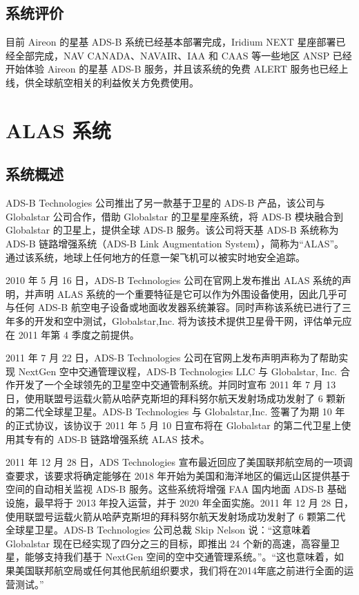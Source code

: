 
\subsection{系统评价}

目前 Aireon 的星基 ADS-B 系统已经基本部署完成，Iridium NEXT 星座部署已经全部完成，NAV CANADA、NAVAIR、IAA 和 CAAS 等一些地区 ANSP 已经开始体验 Aireon 的星基 ADS-B 服务，并且该系统的免费 ALERT 服务也已经上线，供全球航空相关的利益攸关方免费使用。

\section{ALAS 系统}

\subsection{系统概述}

ADS-B Technologies 公司推出了另一款基于卫星的 ADS-B 产品，该公司与 Globalstar 公司合作，借助 Globalstar 的卫星星座系统，将 ADS-B 模块融合到 Globalstar 的卫星上，提供全球 ADS-B 服务。该公司将天基 ADS-B 系统称为 ADS-B 链路增强系统（ADS-B Link Augmentation System），简称为“ALAS”。通过该系统，地球上任何地方的任意一架飞机可以被实时地安全追踪。

2010 年 5 月 16 日，ADS-B Technologies 公司在官网上发布推出 ALAS 系统的声明，并声明 ALAS 系统的一个重要特征是它可以作为外围设备使用，因此几乎可与任何 ADS-B 航空电子设备或地面收发器系统兼容。同时声称该系统已进行了三年多的开发和空中测试，Globalstar,Inc. 将为该技术提供卫星骨干网，评估单元应在 2011 年第 4 季度之前提供。

2011 年 7 月 22 日，ADS-B Technologies 公司在官网上发布声明声称为了帮助实现 NextGen 空中交通管理议程，ADS-B Technologies LLC 与 Globalstar, Inc. 合作开发了一个全球领先的卫星空中交通管制系统。并同时宣布 2011 年 7 月 13 日，使用联盟号运载火箭从哈萨克斯坦的拜科努尔航天发射场成功发射了 6 颗新的第二代全球星卫星。ADS-B Technologies 与 Globalstar,Inc. 签署了为期 10 年的正式协议，该协议于 2011 年 5 月 10 日宣布将在 Globalstar 的第二代卫星上使用其专有的 ADS-B 链路增强系统 ALAS 技术。

2011 年 12 月 28 日，ADS Technologies 宣布最近回应了美国联邦航空局的一项调查要求，该要求将确定能够在 2018 年开始为美国和海洋地区的偏远山区提供基于空间的自动相关监视 ADS-B 服务。这些系统将增强 FAA 国内地面 ADS-B 基础设施，最早将于 2013 年投入运营，并于 2020 年全面实施。2011 年 12 月 28 日，使用联盟号运载火箭从哈萨克斯坦的拜科努尔航天发射场成功发射了 6 颗第二代全球星卫星。ADS-B Technologies 公司总裁 Skip Nelson 说：“这意味着 Globalstar 现在已经实现了四分之三的目标，即推出 24 个新的高速，高容量卫星，能够支持我们基于 NextGen 空间的空中交通管理系统。”。“这也意味着，如果美国联邦航空局或任何其他民航组织要求，我们将在2014年底之前进行全面的运营测试。”


